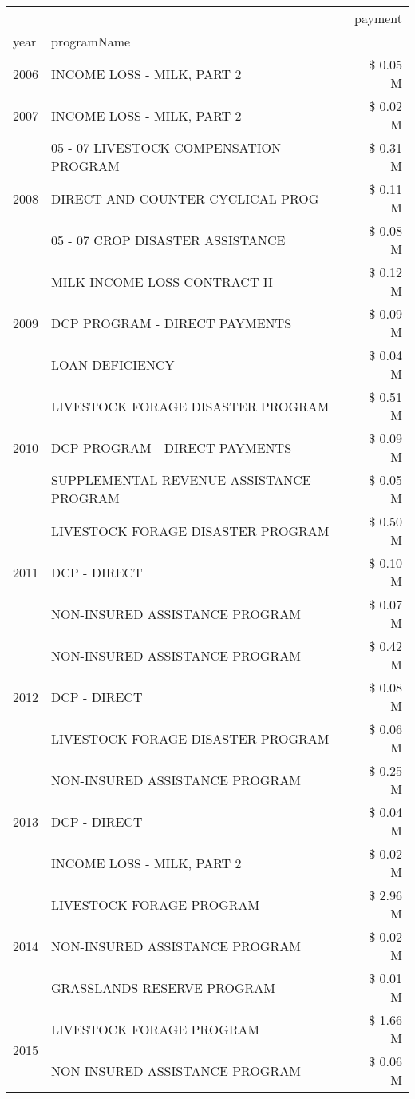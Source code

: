 \begin{tabular}{llr}
\toprule
 &  & payment \\
year & programName &  \\
\midrule
2006 & INCOME LOSS - MILK, PART 2 & \$ 0.05 M \\
\cline{1-3}
2007 & INCOME LOSS - MILK, PART 2 & \$ 0.02 M \\
\cline{1-3}
\multirow[t]{3}{*}{2008} & 05 - 07 LIVESTOCK COMPENSATION PROGRAM & \$ 0.31 M \\
 & DIRECT AND COUNTER CYCLICAL PROG & \$ 0.11 M \\
 & 05 - 07 CROP DISASTER ASSISTANCE & \$ 0.08 M \\
\cline{1-3}
\multirow[t]{3}{*}{2009} & MILK INCOME LOSS CONTRACT II & \$ 0.12 M \\
 & DCP PROGRAM - DIRECT PAYMENTS & \$ 0.09 M \\
 & LOAN DEFICIENCY & \$ 0.04 M \\
\cline{1-3}
\multirow[t]{3}{*}{2010} & LIVESTOCK FORAGE DISASTER  PROGRAM & \$ 0.51 M \\
 & DCP PROGRAM - DIRECT PAYMENTS & \$ 0.09 M \\
 & SUPPLEMENTAL REVENUE ASSISTANCE PROGRAM & \$ 0.05 M \\
\cline{1-3}
\multirow[t]{3}{*}{2011} & LIVESTOCK FORAGE DISASTER PROGRAM & \$ 0.50 M \\
 & DCP - DIRECT & \$ 0.10 M \\
 & NON-INSURED ASSISTANCE PROGRAM & \$ 0.07 M \\
\cline{1-3}
\multirow[t]{3}{*}{2012} & NON-INSURED ASSISTANCE PROGRAM & \$ 0.42 M \\
 & DCP - DIRECT & \$ 0.08 M \\
 & LIVESTOCK FORAGE DISASTER PROGRAM & \$ 0.06 M \\
\cline{1-3}
\multirow[t]{3}{*}{2013} & NON-INSURED ASSISTANCE PROGRAM & \$ 0.25 M \\
 & DCP - DIRECT & \$ 0.04 M \\
 & INCOME LOSS - MILK, PART 2 & \$ 0.02 M \\
\cline{1-3}
\multirow[t]{3}{*}{2014} & LIVESTOCK FORAGE PROGRAM & \$ 2.96 M \\
 & NON-INSURED ASSISTANCE PROGRAM & \$ 0.02 M \\
 & GRASSLANDS RESERVE PROGRAM & \$ 0.01 M \\
\cline{1-3}
\multirow[t]{3}{*}{2015} & LIVESTOCK FORAGE PROGRAM & \$ 1.66 M \\
 & NON-INSURED ASSISTANCE PROGRAM & \$ 0.06 M \\

\end{tabular}
